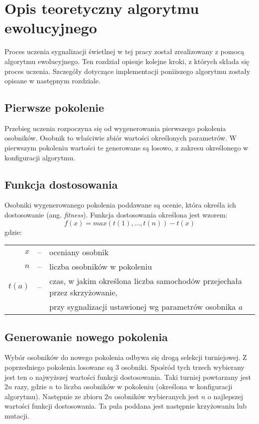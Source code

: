 \chapter*{Opis teoretyczny algorytmu ewolucyjnego}
Proces uczenia sygnalizacji świetlnej w tej pracy został zrealizowany z pomocą algorytmu ewolucyjnego. Ten rozdział opisuje kolejne kroki, z których składa się proces uczenia. Szczegóły dotyczące implementacji poniższego algorytmu zostały opisane w następnym rozdziale.
\section*{Pierwsze pokolenie}
Przebieg uczenia rozpoczyna się od wygenerowania pierwszego pokolenia osobników. Osobnik to właściwie zbiór wartości określonych parametrów. W pierwszym pokoleniu wartości te generowane są losowo, z zakresu określonego w konfiguracji algorytmu. 
\section*{Funkcja dostosowania}
Osobniki wygenerowanego pokolenia poddawane są ocenie, która określa ich dostosowanie (ang. \textit{fitness}). Funkcja dostosowania określona jest wzorem:
\[ f(x) = max(t(1),\ldots, t(n)) - t(x)\]
gdzie:\\
\begin{tabularx}{\textwidth}{ r c l }
$x$ & -- & oceniany osobnik\\
$n$ & -- & liczba osobników w pokoleniu\\
$t(a)$ & -- & czas, w jakim określona liczba samochodów przejechała przez skrzyżowanie,\\ &&przy sygnalizacji ustawionej wg parametrów osobnika $ a $
\end{tabularx}
\section*{Generowanie nowego pokolenia}
Wybór osobników do nowego pokolenia odbywa się drogą selekcji turniejowej. Z poprzedniego pokolenia losowane są 3 osobniki. Spośród tych trzech wybierany jest ten o najwyższej wartości funkcji dostosowania. Taki turniej powtarzany jest $2n$ razy, gdzie $n$ to liczba osobników w pokoleniu (określona w konfiguracji algorytmu). Następnie ze zbioru $2n$ osobników wybieranych jest $n$ o najlepszej wartości funkcji dostosowania. Ta pula poddana jest następnie krzyżowaniu lub mutacji.
